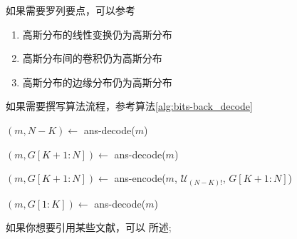     如果需要罗列要点，可以参考
\begin{enumerate}[leftmargin=2cm]
  \item 高斯分布的线性变换仍为高斯分布
  \item 高斯分布间的卷积仍为高斯分布
  \item 高斯分布的边缘分布仍为高斯分布
\end{enumerate}

    如果需要撰写算法流程，参考算法\ref{alg:bits-back_decode}
\begin{algorithm}[htbp]
  \caption{Partial Bits-Back Decode}
  \label{alg:bits-back_decode}
  
  $(m, N - K) \leftarrow$ ans-decode($m$) 
  
  $(m, G[K+1:N]) \leftarrow$ ans-decode($m$) 
  
  $(m, G[K+1:N]) \leftarrow$ ans-encode($m$, $\mathcal{U}_{(N-K)!}$, $G[K+1:N]$) 
  
  $(m, G[1:K]) \leftarrow$ ans-decode($m$) 
  
\end{algorithm}

    如果你想要引用某些文献，可以 \cite{test} 所述;